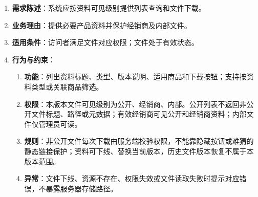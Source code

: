 \begin{enumerate}
\item {\bfseries 需求陈述}：系统应按资料可见级别提供列表查询和文件下载。
\item {\bfseries 业务理由}：提供必要产品资料并保护经销商及内部文件。
\item {\bfseries 适用条件}：访问者满足文件对应权限；文件处于有效状态。
\item {\bfseries 行为与约束}：
\begin{enumerate}
\item {\bfseries 功能}：列出资料标题、类型、版本说明、适用商品和下载按钮；支持按资料类型或关联商品筛选。
\item {\bfseries 权限}：本版本文件可见级别为公开、经销商、内部。公开列表不返回非公开文件标题、路径或元数据；有效经销商可见公开和经销商资料；内部文件仅管理员可读。
\item {\bfseries 规则}：非公开文件每次下载由服务端校验权限，不能靠隐藏按钮或难猜的静态链接保护；资料可下线、替换当前版本，历史文件版本恢复不属于本版本范围。
\item {\bfseries 异常}：文件下线、资源不存在、权限失效或文件读取失败时提示对应错误，不暴露服务器存储路径。
\end{enumerate}

\end{enumerate}


